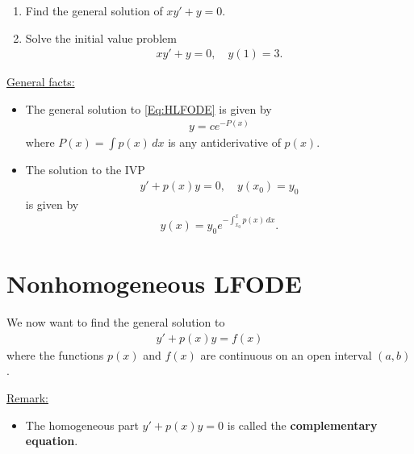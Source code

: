 \documentclass[12pt,a4paper]{article}
\newcounter{example}[section]
\begin{document}
\newpage

\phantom{2}

\newpage

\begin{example}
	\begin{enumerate}
	\item Find the general solution of $xy' + y = 0$.
	\item Solve the initial value problem
		\begin{align*}
		xy' + y = 0, \quad y (1) = 3 .
		\end{align*}
	\end{enumerate}
\end{example}

\newpage

\phantom{2}

\vfill

\underline{General facts:} 

	\begin{itemize}
	\item The general solution to \eqref{Eq:HLFODE} is given by
	\begin{align*}
	y = c e^{-P(x)}
	\end{align*}
where $P(x) = \displaystyle\int p(x) \, dx$ is any antiderivative of $p(x)$.
	\item The solution to the IVP
		\begin{align*}
		y' + p(x) y = 0 , \quad y(x_0) = y_0
		\end{align*}
	is given by
		\begin{align*}
		y(x) = y_0 e^{-\int_{x_0}^x p(x) \, dx} .
		\end{align*}
	\end{itemize}
	
\newpage

\section{Nonhomogeneous LFODE}
We now want to find the general solution to
	\begin{align*}
	y' + p(x) y = f(x)
	\end{align*}
where the functions $p(x)$ and $f(x)$ are continuous on an open interval $(a, b)$.

\underline{Remark:}
	\begin{itemize}
	\item The homogeneous part $y' + p(x) y = 0$ is called the \textbf{complementary equation}.
	\end{itemize}
	
\end{document}
